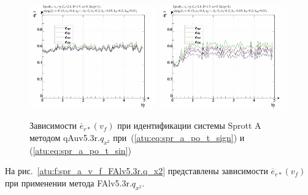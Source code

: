 \begin{figure}[h!]
  \centerline{
    \includegraphics[width=0.49\textwidth]{p/cha/spr_a/qAuv5.3r/sprott_a_qAuv5_3r_qx2-p_v_f_e_sign.png}
    \hfill
    \includegraphics[width=0.49\textwidth]{p/cha/spr_a/qAuv5.3r/sprott_a_qAuv5_3r_qx2-p_v_f_e_sin.png}
  }
  \caption{Зависимости $\overline{e}_{r*}(v_f)$ при идентификации системы Sprott A методом qAuv5.3r.$q_{x^2}$
   при~(\ref{atu:eq:spr_a_po_t_sign}) и (\ref{atu:eq:spr_a_po_t_sin})}
  \label{atu:f:spr_a_v_f_qAuv5.3r.q_x2}
\end{figure}

На рис.~\ref{atu:f:spr_a_v_f_FAlv5.3r.q_x2} представлены зависимости
$\overline{e}_{r*}(v_f)$ при применении метода FAlv5.3r.$q_{x^2}$.

